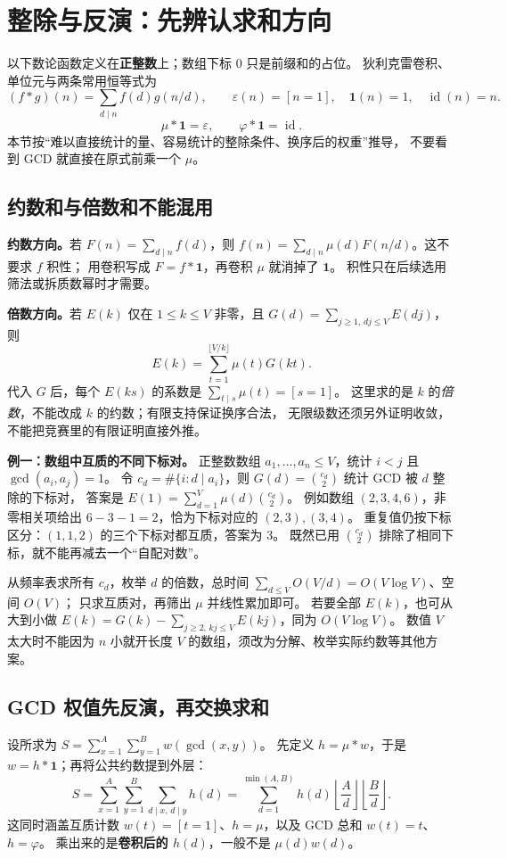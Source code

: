 \section{整除与反演：先辨认求和方向}\label{knowledge-mobius-model}
以下数论函数定义在\textbf{正整数}上；数组下标 0 只是前缀和的占位。
狄利克雷卷积、单位元与两条常用恒等式为
\[
(f*g)(n)=\sum_{d\mid n}f(d)g(n/d),\qquad
\varepsilon(n)=[n=1],\quad \mathbf1(n)=1,\quad \operatorname{id}(n)=n.
\]
\[
\mu*\mathbf1=\varepsilon,\qquad \varphi*\mathbf1=\operatorname{id}.
\]
本节按“难以直接统计的量、容易统计的整除条件、换序后的权重”推导，
不要看到 GCD 就直接在原式前乘一个 $\mu$。

\subsection{约数和与倍数和不能混用}
\textbf{约数方向。}若 $F(n)=\sum_{d\mid n}f(d)$，则
$f(n)=\sum_{d\mid n}\mu(d)F(n/d)$。这不要求 $f$ 积性；
用卷积写成 $F=f*\mathbf1$，再卷积 $\mu$ 就消掉了 $\mathbf1$。
积性只在后续选用筛法或拆质数幂时才需要。

\textbf{倍数方向。}若 $E(k)$ 仅在 $1\le k\le V$ 非零，且
$G(d)=\sum_{j\ge1,\,dj\le V}E(dj)$，则
\[
E(k)=\sum_{t=1}^{\lfloor V/k\rfloor}\mu(t)G(kt).
\]
代入 $G$ 后，每个 $E(ks)$ 的系数是 $\sum_{t\mid s}\mu(t)=[s=1]$。
这里求的是 $k$ 的\emph{倍数}，不能改成 $k$ 的约数；有限支持保证换序合法，
无限级数还须另外证明收敛，不能把竞赛里的有限证明直接外推。

\textbf{例一：数组中互质的不同下标对。}
正整数数组 $a_1,\ldots,a_n\le V$，统计 $i<j$ 且 $\gcd(a_i,a_j)=1$。
令 $c_d=\#\{i:d\mid a_i\}$，则 $G(d)=\binom{c_d}{2}$ 统计 GCD 被 $d$ 整除的下标对，
答案是 $E(1)=\sum_{d=1}^V\mu(d)\binom{c_d}{2}$。
例如数组 $(2,3,4,6)$，非零相关项给出 $6-3-1=2$，恰为下标对应的 $(2,3),(3,4)$。
重复值仍按下标区分：$(1,1,2)$ 的三个下标对都互质，答案为 3。
既然已用 $\binom{c_d}{2}$ 排除了相同下标，就不能再减去一个“自配对数”。

从频率表求所有 $c_d$，枚举 $d$ 的倍数，总时间
$\sum_{d\le V}O(V/d)=O(V\log V)$、空间 $O(V)$；
只求互质对，再筛出 $\mu$ 并线性累加即可。
若要全部 $E(k)$，也可从大到小做
$E(k)=G(k)-\sum_{j\ge2,\,kj\le V}E(kj)$，同为 $O(V\log V)$。
数值 $V$ 太大时不能因为 $n$ 小就开长度 $V$ 的数组，须改为分解、枚举实际约数等其他方案。

\subsection{GCD 权值先反演，再交换求和}
设所求为 $S=\sum_{x=1}^A\sum_{y=1}^B w(\gcd(x,y))$。
先定义 $h=\mu*w$，于是 $w=h*\mathbf1$；再将公共约数提到外层：
\[
S=\sum_{x=1}^A\sum_{y=1}^B\sum_{d\mid x,\,d\mid y}h(d)
=\sum_{d=1}^{\min(A,B)}h(d)
\left\lfloor\frac Ad\right\rfloor\left\lfloor\frac Bd\right\rfloor.
\]
这同时涵盖互质计数 $w(t)=[t=1]$、$h=\mu$，以及 GCD 总和 $w(t)=t$、$h=\varphi$。
乘出来的是\textbf{卷积后的 $h(d)$}，一般不是 $\mu(d)w(d)$。


